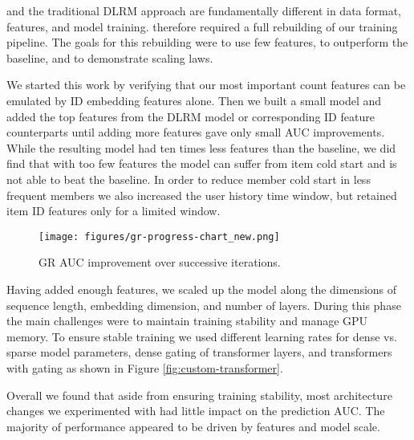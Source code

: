 {\systemname} and the traditional DLRM approach are fundamentally different in data format, features, and model training. {\systemname} therefore required a full rebuilding of our training pipeline. The goals for this rebuilding were to use few features, to outperform the baseline, and to demonstrate scaling laws.

We started this work by verifying that our most important count features can be emulated by ID embedding features alone. Then we built a small {\systemname} model and added the top features from the DLRM model or corresponding ID feature counterparts until adding more features gave only small AUC improvements. While the resulting model had ten times less features than the baseline, we did find that with too few features the model can suffer from item cold start and is not able to beat the baseline. In order to reduce member cold start in less frequent members we also increased the user history time window, but retained item ID features only for a limited window.

\begin{figure}
    \centering
    \texttt{[image: figures/gr-progress-chart\_new.png]}
    \caption{GR AUC improvement over successive iterations.}
    \label{fig:gr-progress}
    \vspace{-1.0em}
\end{figure}

Having added enough features, we scaled up the model along the dimensions of sequence length, embedding dimension, and number of layers. During this phase the main challenges were to maintain training stability and manage GPU memory. To ensure stable training we used different learning rates for dense vs. sparse model parameters, dense gating of transformer layers, and  transformers with gating as shown in Figure \ref{fig:custom-transformer}.

Overall we found that aside from ensuring training stability, most architecture changes we experimented with had little impact on the prediction AUC. The majority of performance appeared to be driven by features and model scale.

